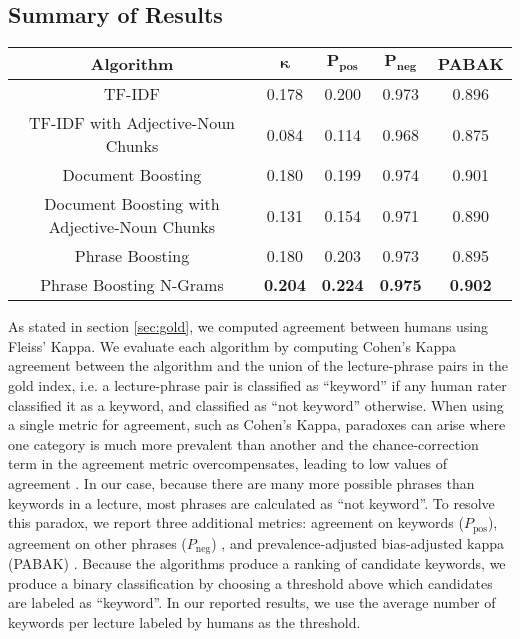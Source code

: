 \subsection{Summary of Results}
\label{sec:sum}



\begin{figure*}[!ht]
\caption{}
\label{fig:main_result}
\begin{tabular}{|c|c|c|c|c|}
\hline
\textbf{Algorithm} & $\mathbf{\kappa}$ & $\mathbf{P_{\text{pos}}}$ & $\mathbf{P_{\text{neg}}}$ & \textbf{PABAK} \\
\hline
TF-IDF & 0.178 & 0.200 & 0.973 & 0.896 \\
\hline
TF-IDF with Adjective-Noun Chunks & 0.084 & 0.114 & 0.968 & 0.875 \\
\hline
Document Boosting & 0.180 & 0.199 & 0.974 & 0.901 \\
\hline
Document Boosting with Adjective-Noun Chunks & 0.131 & 0.154 & 0.971 & 0.890 \\
\hline
Phrase Boosting & 0.180 & 0.203 & 0.973 & 0.895 \\
\hline
Phrase Boosting N-Grams & \textbf{0.204} & \textbf{0.224} & \textbf{0.975} & \textbf{0.902} \\
\hline
\end{tabular}
\end{figure*}

As stated in section \ref{sec:gold}, we computed agreement between humans using Fleiss' Kappa. We evaluate each algorithm by computing Cohen's Kappa agreement between the algorithm and the union of the lecture-phrase pairs in the gold index, i.e. a lecture-phrase pair is classified as ``keyword'' if any human rater classified it as a keyword, and classified as ``not keyword'' otherwise. When using a single metric for agreement, such as Cohen's Kappa, paradoxes can arise where one category is much more prevalent than another and the chance-correction term in the agreement metric overcompensates, leading to low values of agreement \cite{feinstein1990high}. In our case, because there are many more possible phrases than keywords in a lecture, most phrases are calculated as ``not keyword''. To resolve this paradox, we report three additional metrics: agreement on keywords ($P_{\text{pos}}$), agreement on other phrases ($P_{\text{neg}}$) \cite{cicchetti1990high}, and prevalence-adjusted bias-adjusted kappa (PABAK) \cite{byrt1993bias}. Because the algorithms produce a ranking of candidate keywords, we produce a binary classification by choosing a threshold above which candidates are labeled as ``keyword''. In our reported results, we use the average number of keywords per lecture labeled by humans as the threshold.

